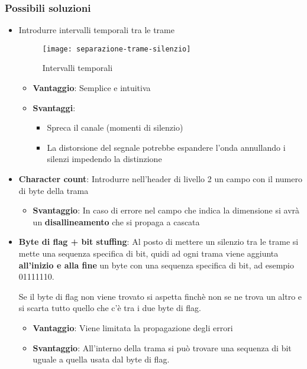 \documentclass[a4paper]{article}
\begin{document}
\subsubsection{Possibili soluzioni}
\begin{itemize}
  \item Introdurre intervalli temporali tra le trame
    \begin{figure}[H]
      \centering
      \texttt{[image: separazione-trame-silenzio]}
      \caption{Intervalli temporali}
    \end{figure}
    \begin{itemize}
      \item \textbf{Vantaggio}: Semplice e intuitiva
      \item \textbf{Svantaggi}: 
        \begin{itemize}
          \item Spreca il canale (momenti di silenzio)
          \item La distorsione del segnale potrebbe espandere l'onda annullando
            i silenzi impedendo la distinzione
        \end{itemize}
    \end{itemize}

  \item \textbf{Character count}: Introdurre nell'header di livello 2 un campo con il
    numero di byte della trama
    \begin{itemize}
      \item \textbf{Svantaggio}: In caso di errore nel campo che indica la dimensione
        si avrà un \textbf{disallineamento} che si propaga a cascata
    \end{itemize}

  \item \textbf{Byte di flag + bit stuffing}: Al posto di mettere un silenzio tra le
    trame si mette una sequenza specifica di bit, quidi ad ogni trama viene
    aggiunta \textbf{all'inizio e alla fine} un byte con una sequenza specifica
    di bit, ad esempio 01111110.

    Se il byte di flag non viene trovato si aspetta finchè non se ne trova un altro
    e si scarta tutto quello che c'è tra i due byte di flag.
    \begin{itemize}
      \item \textbf{Vantaggio}: Viene limitata la propagazione degli errori
      \item \textbf{Svantaggio}: All'interno della trama si può trovare una sequenza
        di bit uguale a quella usata dal byte di flag.
    \end{itemize}


\end{itemize}
\end{document}

